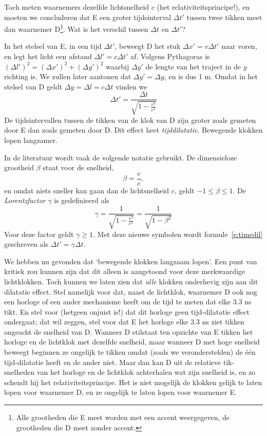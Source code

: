 Toch meten waarnemers dezelfde lichtsnelheid $c$ (het
relativiteitsprincipe!), en moeten we concluderen dat E een groter
tijdsinterval $\Delta t'$ tussen twee tikken meet dan waarnemer D\footnote{Alle grootheden die E meet worden met een accent
weergegeven, de grootheden die D meet zonder accent.}.
 Wat is het verschil tussen $\Delta t$ en $\Delta t'$?

In het stelsel van E, in een tijd $\Delta t'$, beweegt D het stuk
$\Delta x'=v \Delta t'$ naar voren, en legt het licht een afstand
$\Delta l' = c\Delta t'$ af. Volgens Pythagoras is $(\Delta l')^2
=(\Delta x')^2 +(\Delta y')^2$ waarbij $\Delta y'$ de lengte
van het traject in de $y$ richting is.  We zullen later aantonen dat $\Delta y'
= \Delta y$, en is dus 1 m. Omdat in het stelsel van D geldt $\Delta y= \Delta l = c \Delta t$ vinden we
\begin{equation}\label{e:timedil}
\Delta t' = \frac{\Delta t}{\sqrt{1-\frac{v^2}{c^2}}}
\end{equation}
De tijdsintervallen tussen de tikken van de klok van D zijn groter
zoals gemeten door E dan zoals gemeten door D. Dit effect heet {\it
tijddilatatie}. Bewegende klokken lopen langzamer.

In de literatuur wordt vaak de volgende notatie gebruikt. De dimensieloze grootheid $\beta$ staat voor de snelheid, 
\begin{equation}
\beta = \frac{v}{c},
\end{equation}
en omdat niets sneller kan gaan dan de lichtsnelheid $c$, geldt $-1 \leq \beta \leq 1$. De {\it Lorentzfactor} $\gamma$ is gedefinieerd als
\begin{equation}
\gamma = \frac{1}{\sqrt{1-\frac{v^{2}}{c^{2}}}} = \frac{1}{\sqrt{1-\beta^2}}\label{f:gamma}
\end{equation}
Voor deze factor geldt $\gamma \geq 1$. Met deze nieuwe symbolen wordt formule~\ref{e:timedil} geschreven als $\Delta t' = \gamma \Delta t$. 

We hebben nu gevonden dat `bewegende klokken langzaam lopen'. Een punt
van kritiek zou kunnen zijn dat dit alleen is aangetoond voor deze
merkwaardige lichtklokken. Toch kunnen we laten zien dat {\it alle}
klokken onderhevig zijn aan dit dilatatie effect. Stel namelijk voor
dat, naast de lichtklok, waarnemer D ook nog een horloge of een ander
mechanisme heeft om de tijd te meten dat elke 3.3 ns tikt. En stel
voor (hetgeen onjuist is!) dat dit horloge geen tijd-dilatatie effect
ondergaat; dat wil zeggen, stel voor dat E het horloge elke 3.3 ns
ziet tikken ongeacht de snelheid van D. Wanneer D stilstaat ten
opzichte van E tikken het horloge en de lichtklok met dezelfde
snelheid, maar wanneer D met hoge snelheid beweegt beginnen ze
ongelijk te tikken omdat (zoals we veronderstelden) de \'e\'en
tijd-dilatatie heeft en de ander niet. Maar dan kan D uit de relatieve
tik-snelheden van het horloge en de lichtklok achterhalen wat zijn
snelheid is, en zo schendt hij het relativiteitsprincipe. Het is niet
mogelijk de klokken gelijk te laten lopen voor waarnemer D, en ze
ongelijk te laten lopen voor waarnemer E.

